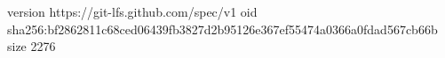 version https://git-lfs.github.com/spec/v1
oid sha256:bf2862811c68ced06439fb3827d2b95126e367ef55474a0366a0fdad567cb66b
size 2276
